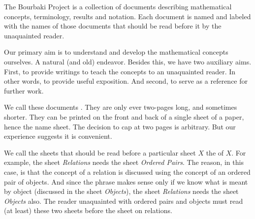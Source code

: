 
\sbasic

\sstart
{}

The Bourbaki Project is a collection
of documents describing mathematical
concepts, terminology, results and
notation. Each document is named and
labeled with the names of those documents
that should be read before it by the
unaquainted reader.

Our primary aim is to understand and
develop the mathematical concepts ourselves.
A natural (and old) endeavor.
Besides this, we have two auxiliary aims.
First, to provide writings to teach
the concepts to an unaquainted reader. In other
words, to provide useful exposition.
And second, to serve as a reference for
further work.

We call these documents .
They are only ever two-pages long, and
sometimes shorter.
They can be printed on the front
and back of a single
sheet of a paper, hence the name sheet.
The decision to cap at two pages is
arbitrary.
But our
experience suggests it is convenient.

We call the sheets that should
be read before a particular sheet
$X$ the  of $X$.
For example, the sheet \textit{Relations}
needs the sheet \textit{Ordered Pairs}.
The reason, in this case, is that the
concept of a relation is discussed using
the concept of an ordered pair of objects.
And since the phrase
 makes sense
only if we know what is meant by object
(discussed in the sheet \textit{Objects}),
the sheet \textit{Relations} needs the sheet
\textit{Objects} also.
The reader unaquainted with
ordered pairs and
objects must read (at least) these two
sheets before the sheet on relations.



%
%

